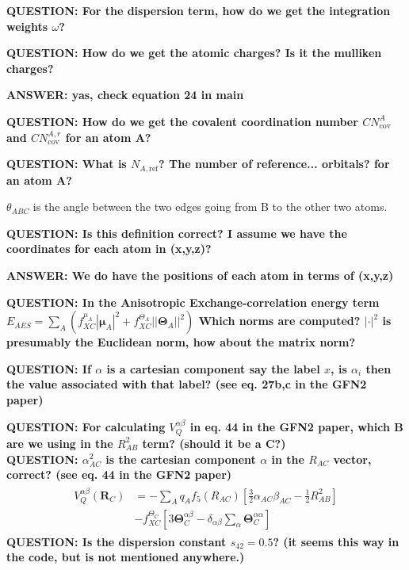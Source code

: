 \documentclass{article}
\newcommand{\q}[1]{\textbf{QUESTION: #1}}
\newcommand{\A}[1]{\textbf{ANSWER: #1}}
\begin{document}
\vspace{10pt}
\noindent
\q{For the dispersion term, how do we get the integration weights \(\omega\)?}

\vspace{10pt}
\noindent
\q{How do we get the atomic charges? Is it the mulliken charges?}


\A{yas, check equation 24 in main}

\vspace{10pt}
\noindent
\q{How do we get the covalent coordination number \(CN_\text{cov}^A\) and \(CN_\text{cov}^{A,r}\) for an atom A?}

\vspace{10pt}
\noindent
\q{What is \(N_{A,\text{ref}}\)? The number of reference... orbitals? for an atom A?}


\newpage
\noindent
\(\theta_{ABC}\) is the angle between the two edges going from B to the other two atoms.

\noindent
\q{Is this definition correct? I assume we have the coordinates for each atom in (x,y,z)?}

\A{%
    We do have the positions of each atom in terms of (x,y,z)}

\vspace{10pt}
\noindent
\q{In the Anisotropic Exchange-correlation energy term $E_{AES} = \sum_A(f_{XC}^{\mu_A}|\pmb\mu_A|^2 + f_{XC}^{\Theta_A}||\pmb\Theta_A||^2)$ Which norms are computed? $|\cdot |^2$ is presumably the Euclidean norm, how about the matrix norm?}

\vspace{10pt}
\noindent
\q{If $\alpha$ is a cartesian component say the label $x$, is $\alpha_i$ then the value associated with that label? (see eq. 27b,c in the GFN2 paper)}

\vspace{10pt}
\noindent
\q{For calculating $V_Q^{\alpha\beta}$ in eq. 44 in the GFN2 paper, which B are we using in the $R_{AB}^2$ term? (should it be a C?)}\\
\q{$\alpha_{AC}^2$ is the cartesian component $\alpha$ in the $R_{AC}$ vector, correct? (see eq. 44 in the GFN2 paper)}
\begin{align*}
    \begin{split}
        V_Q^{\alpha\beta}(\pmb{R}_C)
            &= -\sum_A q_Af_5(R_{AC})\left[          
                \frac{3}{2}\alpha_{AC}\beta_{AC}- \frac{1}{2}R_{AB}^2 %
                \right]\\
        &-f_{XC}^{\Theta_C}\left[3\pmb\Theta_C^{\alpha\beta}-\delta_{\alpha\beta}\sum_\alpha\pmb\Theta_C^{\alpha\alpha}\right]
    \end{split}
\end{align*}
\q{Is the dispersion constant $s_{42} = 0.5$? (it seems this way in the code, but is not mentioned anywhere.)}
\end{document}
